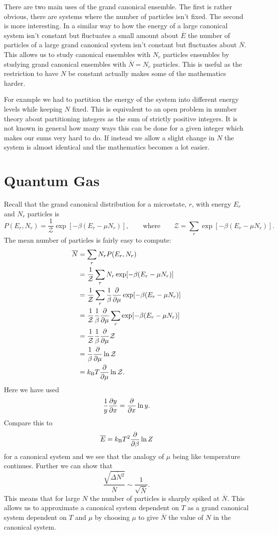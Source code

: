 \documentclass[a4paper]{article}
\newcommand{\boltzmann}{k_\mathrm{B}}
\newcommand{\mean}[1]{\overline{#1}}
\newcommand{\partition}{\mathcal{Z}}
\begin{document}
    There are two main uses of the grand canonical ensemble.
    The first is rather obvious, there are systems where the number of particles isn't fixed.
    The second is more interesting.
    In a similar way to how the energy of a large canonical system isn't constant but fluctuates a small amount about \(\mean{E}\) the number of particles of a large grand canonical system isn't constant but fluctuates about \(\mean{N}\).
    This allows us to study canonical ensembles with \(N_c\) particles ensembles by studying grand canonical ensembles with \(\mean{N} = N_c\) particles.
    This is useful as the restriction to have \(N\) be constant actually makes some of the mathematics harder.
    
    For example we had to partition the energy of the system into different energy levels while keeping \(N\) fixed.
    This is equivalent to an open problem in number theory about partitioning integers as the sum of strictly positive integers.
    It is not known in general how many ways this can be done for a given integer which makes our sums very hard to do.
    If instead we allow a slight change in \(N\) the system is almost identical and the mathematics becomes a lot easier.
    
    \section{Quantum Gas}
    Recall that the grand canonical distribution for a microstate, \(r\), with energy \(E_r\) and \(N_r\) particles is
    \[P(E_r, N_r) = \frac{1}{\partition}\exp[-\beta(E_r - \mu N_r)], \qquad\text{where}\qquad \partition = \sum_r \exp[-\beta(E_r - \mu N_r)].\]
    The mean number of particles is fairly easy to compute:
    \begin{align*}
        \mean{N} &= \sum_r N_rP(E_r, N_r)\\
        &= \frac{1}{\partition}\sum_r N_r\exp[-\beta(E_r - \mu N_r)]\\
        &= \frac{1}{\partition} \sum_r \frac{1}{\beta}\pdv{\mu}\exp[-\beta(E_r - \mu N_r)]\\
        &= \frac{1}{\partition} \frac{1}{\beta}\pdv{\mu} \sum_r\exp[-\beta(E_r - \mu N_r)]\\
        &= \frac{1}{\partition}\frac{1}{\beta}\pdv{\mu}\partition\\
        &= \frac{1}{\beta}\pdv{\mu}\ln \partition\\
        &= \boltzmann T\pdv{\mu}\ln\partition.
    \end{align*}
    Here we have used
    \[\frac{1}{y}\pdv{y}{x} = \pdv{x}\ln y.\]
    Compare this to
    \[\mean{E} = \boltzmann T^2\pdv{\beta}\ln Z\]
    for a canonical system and we see that the analogy of \(\mu\) being like temperature continues.
    Further we can show that
    \[\frac{\sqrt{\mean{\Delta N^2}}}{\mean{N}} \sim \frac{1}{\sqrt{\mean{N}}}.\]
    This means that for large \(N\) the number of particles is sharply spiked at \(\mean{N}\).
    This allows us to approximate a canonical system dependent on \(T\) as a grand canonical system dependent on \(T\) and \(\mu\) by choosing \(\mu\) to give \(\mean{N}\) the value of \(N\) in the canonical system.
    
\end{document}
